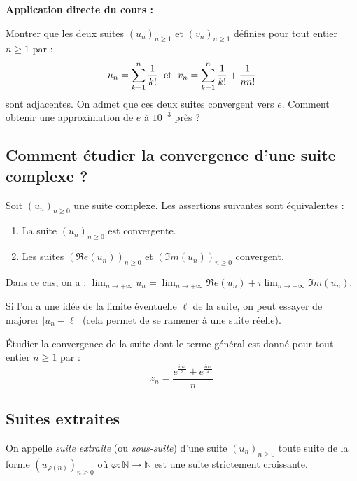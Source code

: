 \documentclass[french,11pt,twoside]{VcCours}
\newenvironment{ApplicationDirecte}{\textbf{Application directe du cours :}

}{}
\begin{document}
\begin{ApplicationDirecte}
Montrer que les deux suites $(u_n)_{n \geq 1}$ et $(v_n)_{n \geq 1}$ définies pour tout entier $n \geq 1$ par :
\[ u_n = \sum_{k=1}^n \frac{1}{k!} \; \hbox{ et } \; v_n = \sum_{k=1}^n \frac{1}{k!} + \frac{1}{n n!} \]
sont adjacentes. On admet que ces deux suites convergent vers $e$. Comment obtenir une approximation de $e$ à $10^{-3}$ près ?
\end{ApplicationDirecte}

\newpage
\subsection{Comment étudier la convergence d'une suite complexe ?}

\begin{Proposition}{} Soit $(u_n)_{n \geq 0}$ une suite complexe. Les assertions suivantes sont équivalentes :

\begin{enumerate}
\item La suite $(u_n)_{n \geq 0}$ est convergente.
\item Les suites $(\Re e(u_n))_{n \geq 0}$ et $(\Im m(u_n))_{n \geq 0}$ convergent.
\end{enumerate}

Dans ce cas, on a : $\lim_{n \rightarrow + \infty} u_n = \lim_{n \rightarrow + \infty} \Re e(u_n) + i \lim_{n \rightarrow + \infty} \Im m(u_n)$.
\end{Proposition}

\begin{Remarque}{} Si l'on a une idée de la limite éventuelle $\ell$ de la suite, on peut essayer de majorer $\vert u_n- \ell \vert$ (cela permet de se ramener à une suite réelle).
\end{Remarque}

\begin{Exemple} Étudier la convergence de la suite dont le terme général est donné pour tout entier $n \geq 1$ par : 
$$ z_n = \frac{e^{\frac{i n \pi}{3}} + e^{\frac{i n \pi}{4}}}{n} $$ 

\vspace{4cm}
\end{Exemple}

\subsection{Suites extraites}

\begin{Definition}{} 
On appelle \emph{suite extraite} (ou \emph{sous-suite}) d'une suite 
$(u_n)_{n \geq 0}$ toute suite de la forme $(u_{\varphi(n)})_{n \geq 0}$ 
où $\varphi : \mathbb{N} \rightarrow \mathbb{N}$ est une suite 
strictement croissante.
\end{Definition}
\end{document}
